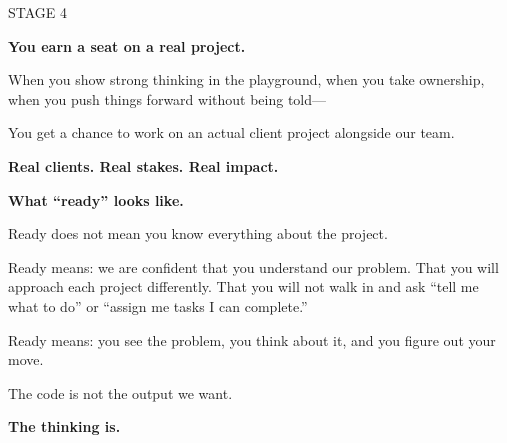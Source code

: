 \documentclass[aspectratio=169]{beamer}
\begin{document}
\begin{frame}{}
\vfill
\begin{center}
{\color{stage}\fontsize{18}{22}\selectfont STAGE 4\par}
\vspace{10pt}
{\fontsize{26}{32}\selectfont\bfseries You earn a seat on a real project.\par}
\vspace{30pt}
\begin{minipage}{0.80\textwidth}
{\color{darktext}When you show strong thinking in the playground, when you take ownership, when you push things forward without being told---\par}
\vspace{14pt}
{\color{darktext}You get a chance to work on an actual client project alongside our team.\par}
\vspace{14pt}
{\color{accent}\bfseries Real clients. Real stakes. Real impact.\par}
\end{minipage}
\end{center}
\vfill
\end{frame}

\begin{frame}{}
\vfill
\begin{center}
{\fontsize{26}{32}\selectfont\bfseries What ``ready'' looks like.\par}
\vspace{30pt}
\begin{minipage}{0.80\textwidth}
{\color{darktext}Ready does not mean you know everything about the project.\par}
\vspace{14pt}
{\color{darktext}Ready means: we are confident that you understand our problem. That you will approach each project differently. That you will not walk in and ask ``tell me what to do'' or ``assign me tasks I can complete.''\par}
\vspace{14pt}
{\color{darktext}Ready means: you see the problem, you think about it, and you figure out your move.\par}
\vspace{14pt}
{\color{dimtext}The code is not the output we want.\par}
\vspace{4pt}
{\color{accent}\bfseries The thinking is.\par}
\end{minipage}
\end{center}
\vfill
\end{frame}
\end{document}
